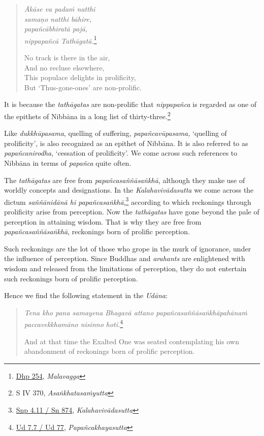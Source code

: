 \begin{quote}
\emph{Ākāse va padaṁ natthi}\\
\emph{samaṇo natthi bāhire,}\\
\emph{papañcābhiratā pajā,}\\
\emph{nippapañcā Tathāgatā.}\footnote{\href{https://suttacentral.net/dhp235-255/pli/ms}{Dhp 254}, \emph{Malavagga}}

No track is there in the air,\\
And no recluse elsewhere,\\
This populace delights in prolificity,\\
But `Thus-gone-ones' are non-prolific.
\end{quote}

It is because the \emph{tathāgatas} are non-prolific that \emph{nippapañca} is regarded as one of the epithets of Nibbāna in a long list of thirty-three.\footnote{S IV 370, \emph{Asaṅkhatasaṁyutta}}

Like \emph{dukkhūpasama}, quelling of suffering, \emph{papañcavūpasama,} `quelling of prolificity', is also recognized as an epithet of Nibbāna. It is also referred to as \emph{papañcanirodha}, `cessation of prolificity'. We come across such references to Nibbāna in terms of \emph{papañca} quite often.

The \emph{tathāgatas} are free from \emph{papañcasaññāsaṅkhā}, although they make use of worldly concepts and designations. In the \emph{Kalahavivādasutta} we come across the dictum \emph{saññānidānā hi papañcasaṅkhā},\footnote{\href{https://suttacentral.net/snp4.11/pli/ms}{Snp 4.11 / Sn 874}, \emph{Kalahavivādasutta}} according to which reckonings through prolificity arise from perception. Now the \emph{tathāgatas} have gone beyond the pale of perception in attaining wisdom. That is why they are free from \emph{papañcasaññāsaṅkhā}, reckonings born of prolific perception.

Such reckonings are the lot of those who grope in the murk of ignorance, under the influence of perception. Since Buddhas and \emph{arahants} are enlightened with wisdom and released from the limitations of perception, they do not entertain such reckonings born of prolific perception.

\clearpage

Hence we find the following statement in the \emph{Udāna}:

\begin{quote}
\emph{Tena kho pana samayena Bhagavā attano papañcasaññāsaṅkhāpahānaṁ paccavekkhamāno nisinno hoti.}\footnote{\href{https://suttacentral.net/ud7.7/pli/ms}{Ud 7.7 / Ud 77}, \emph{Papañcakhayasutta}}

And at that time the Exalted One was seated contemplating his own abandonment of reckonings born of prolific perception.
\end{quote}

